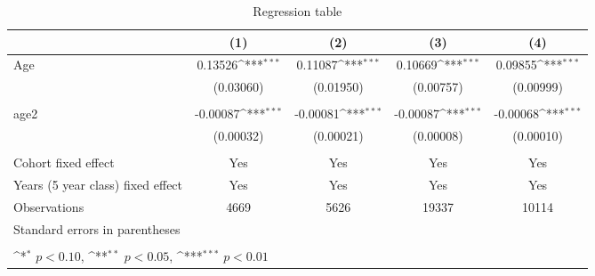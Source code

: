 \begin{table}[htbp]\centering
    \def\sym#1{\ifmmode^{#1}\else\(^{#1}\)\fi}
    \caption{Regression table \label{reg2}}
    \begin{tabular}{l*{4}{c}}
    \hline
                        &\multicolumn{1}{c}{(1)}         &\multicolumn{1}{c}{(2)}         &\multicolumn{1}{c}{(3)}         &\multicolumn{1}{c}{(4)}         \\
    \hline
    Age                 &     0.13526\sym{***}&     0.11087\sym{***}&     0.10669\sym{***}&     0.09855\sym{***}\\
                        &   (0.03060)         &   (0.01950)         &   (0.00757)         &   (0.00999)         \\
    \\
    age2                &    -0.00087\sym{***}&    -0.00081\sym{***}&    -0.00087\sym{***}&    -0.00068\sym{***}\\
                        &   (0.00032)         &   (0.00021)         &   (0.00008)         &   (0.00010)         \\
    \\
    Cohort fixed effect           &       Yes        &       Yes      & Yes & Yes  \\
    Years (5 year class) fixed effect             &       Yes       &       Yes      & Yes  & Yes   \\
    \hline
    Observations        &        4669         &        5626         &       19337         &       10114         \\
    \hline
    \multicolumn{5}{l}{\footnotesize Standard errors in parentheses}\\
    \multicolumn{5}{l}{\footnotesize }\\
    \multicolumn{5}{l}{\footnotesize \sym{*} \(p<0.10\), \sym{**} \(p<0.05\), \sym{***} \(p<0.01\)}\\
    \end{tabular}
    \end{table}
    